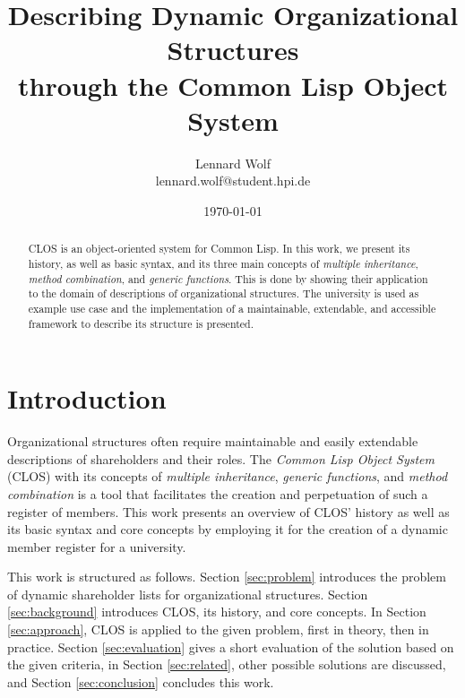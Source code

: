 \documentclass[oribibl]{llncs}
\author{Lennard Wolf \\
        lennard.wolf@student.hpi.de}
\institute{ Hasso Plattner Institute \\
            Prof.-Dr.-Helmert-Straße 2-3 \\
            14482 Potsdam \\
            Germany}
\title{Describing Dynamic Organizational Structures \\
 through the Common Lisp Object System}
\date{\today}
\begin{document}
\thispagestyle{empty}
\vfill

%
\maketitle
%
\begin{abstract}
CLOS is an object-oriented system for Common Lisp. In this work, we present its history, as well as basic syntax, and its three main concepts of \emph{multiple inheritance}, \emph{method combination}, and \emph{generic functions}. This is done by showing their application to the domain of descriptions of organizational structures. The university is used as example use case and the implementation of a maintainable, extendable, and accessible framework to describe its structure is presented.

\end{abstract}
%


\section{Introduction}

Organizational structures often require maintainable and easily extendable descriptions of shareholders and their roles. The \emph{Common Lisp Object System} (CLOS) with its concepts of \emph{multiple inheritance}, \emph{generic functions}, and \emph{method combination} is a tool that facilitates the creation and perpetuation of such a register of members. This work presents an overview of CLOS' history as well as its basic syntax and core concepts by employing it for the creation of a dynamic member register for a university. 
\newline

This work is structured as follows. Section \ref{sec:problem} introduces the problem of dynamic shareholder lists for organizational structures. Section \ref{sec:background} introduces CLOS, its history, and core concepts. In Section \ref{sec:approach}, CLOS is applied to the given problem, first in theory, then in practice. Section \ref{sec:evaluation} gives a short evaluation of the solution based on the given criteria, in Section \ref{sec:related}, other possible solutions are discussed, and Section \ref{sec:conclusion} concludes this work.
\end{document}
